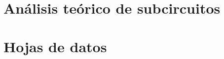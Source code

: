 \pagestyle{allpages}

\appendix


\appendixpage
\addappheadtotoc



\section{Análisis teórico de subcircuitos}

\resetallcounters


\clearpage



\clearpage



\cleardoublepage



\cleardoublepage

\section{Hojas de datos}


\cleardoublepage



